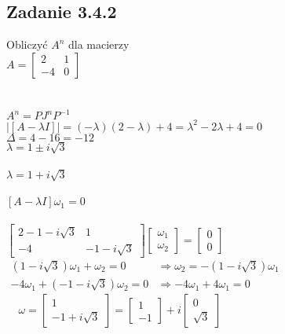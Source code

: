 \pagebreak
\subsection*{Zadanie 3.4.2} {\color{darkgray}
	Obliczyć $A^n$ dla macierzy\\
	$A=\left[ \begin{array}{cc} 2&1\\-4&0\end{array}\right]$\\
}\lineh
\\\\
$A^n=PJ^nP^{-1}$\\
$| [A-\lambda I] |=(-\lambda)(2-\lambda)+4=\lambda^2-2\lambda+4=0$\\
$\Delta=4-16=-12$\\
$\lambda=1\pm i\sqrt{3}$\\
\\
$\boxed{\lambda=1+ i\sqrt{3}}$\\
\\
$[A-\lambda I]\omega_1=0$\\
\\
$\left[ \begin{array}{cc}     2-1-i\sqrt{3}&1\\-4&-1-i\sqrt{3}    \end{array}\right]\left[ \begin{array}{c}     \omega_{1}\\\omega_{2}    \end{array}\right]=\left[ \begin{array}{c}     0\\0    \end{array}\right]$\\
$\begin{array}{ll}    (1-i\sqrt{3})\omega_1+\omega_2=0 &\Rightarrow \omega_2=-(1-i\sqrt{3})\omega_1 \\ -4\omega_1+(-1-i\sqrt{3})\omega_2=0&\Rightarrow -4\omega_1+4\omega_1=0\end{array}$\\
$\ \ \ \ \ \omega=\left[ \begin{array}{c}     1\\-1+i\sqrt{3}    \end{array}\right]=\left[ \begin{array}{c}   1\\-1   \end{array}\right]+i\left[ \begin{array}{c}   0\\\sqrt{3}   \end{array}\right]$\\
